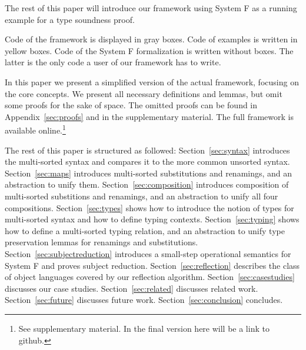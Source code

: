 \documentclass[sigplan,10pt, anonymous]{acmart}
\begin{document}
  The rest of this paper will introduce our framework using System F
  as a running example for a type soundness proof.

  Code of the framework is displayed in gray boxes.
  Code of examples is written in yellow boxes.
  Code of the System F formalization is written without boxes. The
  latter is the only code a user of our framework has to write.

  In this paper we present a simplified version of the actual
  framework, focusing on the core concepts. We present all necessary
  definitions and lemmas, but omit some proofs for the sake of
  space. The omitted proofs can be found in Appendix~\ref{sec:proofs}
  and in the supplementary material.
  The full framework is available online.\footnote{See supplementary material. In the final version here will be a link to github.}

  The rest of this paper is structured as followed:
  Section~\ref{sec:syntax} introduces the multi-sorted syntax and compares it to the
  more common unsorted syntax.
  Section~\ref{sec:maps} introduces multi-sorted substitutions and renamings, and
  an abstraction to unify them.
  Section~\ref{sec:composition} introduces composition of multi-sorted
  substitions and renamings, and an abstraction to unify all four
  compositions.
  Section~\ref{sec:types} shows how to introduce the notion of types
  for multi-sorted syntax and how to define typing contexts.
  Section~\ref{sec:typing} shows how to define a multi-sorted typing relation,
  and an abstraction to unify type preservation lemmas for renamings and substitutions.
  Section~\ref{sec:subjectreduction} introduces a small-step
  operational semantics for System F and proves subject reduction.
  Section~\ref{sec:reflection} describes the class of object languages covered by
  our reflection algorithm.
  Section~\ref{sec:casestudies} discusses our case studies.
  Section~\ref{sec:related} discusses related work.
  Section~\ref{sec:future} discusses future work.
  Section~\ref{sec:conclusion} concludes.
\end{document}
